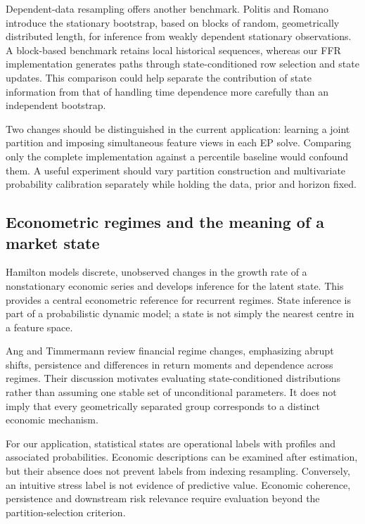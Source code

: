 \documentclass[11pt,a4paper]{article}
\begin{document}
Dependent-data resampling offers another benchmark. Politis and Romano \cite{politisromano1994} introduce the stationary bootstrap, based on blocks of random, geometrically distributed length, for inference from weakly dependent stationary observations. A block-based benchmark retains local historical sequences, whereas our FFR implementation generates paths through state-conditioned row selection and state updates. This comparison could help separate the contribution of state information from that of handling time dependence more carefully than an independent bootstrap.

Two changes should be distinguished in the current application: learning a joint partition and imposing simultaneous feature views in each EP solve. Comparing only the complete implementation against a percentile baseline would confound them. A useful experiment should vary partition construction and multivariate probability calibration separately while holding the data, prior and horizon fixed.

\subsection{Econometric regimes and the meaning of a market state}

Hamilton \cite{hamilton1989} models discrete, unobserved changes in the growth rate of a nonstationary economic series and develops inference for the latent state. This provides a central econometric reference for recurrent regimes. State inference is part of a probabilistic dynamic model; a state is not simply the nearest centre in a feature space.

Ang and Timmermann \cite{angtimmermann2012} review financial regime changes, emphasizing abrupt shifts, persistence and differences in return moments and dependence across regimes. Their discussion motivates evaluating state-conditioned distributions rather than assuming one stable set of unconditional parameters. It does not imply that every geometrically separated group corresponds to a distinct economic mechanism.

For our application, statistical states are operational labels with profiles and associated probabilities. Economic descriptions can be examined after estimation, but their absence does not prevent labels from indexing resampling. Conversely, an intuitive stress label is not evidence of predictive value. Economic coherence, persistence and downstream risk relevance require evaluation beyond the partition-selection criterion.
\end{document}
